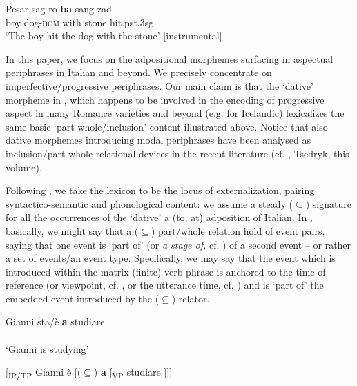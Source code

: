 \documentclass[output=paper,modfonts,nonflat,newtxmath,colorlinks,citecolor=brown]{langsci/langscibook}
\begin{document}
     \ex  \label{ex:franco:7b}
    \gll Pesar sag-ro  \textbf{ba} sang zad\\
        boy dog-\textsc{dom}  with   stone   hit.pst.3sg \\
    \glt ‘The boy hit the dog with the stone’ \hfill [instrumental]
    \z
    \z

In this paper, we focus on the adpositional morphemes surfacing in aspectual periphrases in Italian and beyond. We precisely concentrate on imperfective/progressive periphrases. Our main claim is that the ‘dative’ morpheme in , which happens to be involved in the encoding of progressive aspect in many Romance varieties \citep{ManziniLorussoSavoia2017} and beyond (e.g. \citealt{Johannsdottir2011} for Icelandic) lexicalizes the same basic ‘part-whole/inclusion’ content illustrated above. Notice that also dative morphemes introducing modal periphrases have been analysed as inclusion/part-whole relational devices in the recent literature (cf. \citealt{BjorkmanCowper2016}, Tsedryk, this volume). 

Following \citet{BerwickChomsky2011}, we take the lexicon to be the locus of externalization, pairing syntactico-semantic and phonological content: we assume a steady (${\subseteq}$) signature for all the occurrences of the ‘dative’ {a} (to, at) adposition of Italian. In , basically, we might say that a (${\subseteq}$) part/whole relation hold of event pairs, saying that one event is ‘part of’ (or \textit{a stage of,} cf. \citealt{Landman1992}) of a second event – or rather a set of events/an event type. Specifically, we may say that the event which is introduced within the matrix (finite) verb phrase is anchored to the time of reference (or viewpoint, cf. \citealt{Comrie1976}, or the utterance time, cf. \citealt{Higginbotham2009}) and is ‘part of’ the embedded event introduced by the (${\subseteq}$) relator. 

\ea%
    \label{ex:franco:8}
    \ea \label{ex:franco:8a}
    \gll Gianni sta/è \textbf{a} studiare\\
        \\
    \glt ‘Gianni is studying’
    
     \ex \label{ex:franco:8b}
     {[}\textsubscript{IP/TP} Gianni è [(${\subseteq}$) \textbf{a} [\textsubscript{VP} studiare {]]]}
    \z
    \z
    
\end{document}
